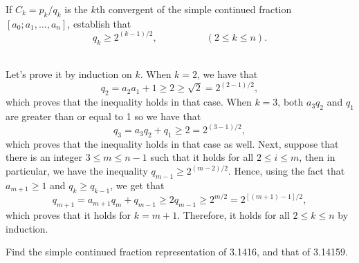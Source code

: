\begin{exercise}
    If $C_k = p_k/q_k$ is the $k$th convergent of the simple continued fraction $[a_0; a_1, ..., a_n]$, establish that
    $$q_k \geq 2^{(k-1)/2}, \qquad \quad \qquad (2\leq k \leq n).$$
     \\
\end{exercise}

\begin{solution}
    Let's prove it by induction on $k$. When $k = 2$, we have that
    $$q_2 = a_2a_1 + 1 \geq 2 \geq \sqrt{2} = 2^{(2-1)/2},$$
    which proves that the inequality holds in that case. When $k = 3$, both $a_3q_2$ and $q_1$ are greater than or equal to 1 so we have that
    $$q_3 = a_3q_2 + q_1 \geq 2 = 2^{(3-1)/2},$$
    which proves that the inequality holds in that case as well. Next, suppose that there is an integer $3 \leq m \leq n-1$ such that it holds for all $2 \leq i \leq m$, then in particular, we have the inequality $q_{m-1} \geq 2^{(m-2)/2}$. Hence, using the fact that $a_{m+1} \geq 1$ and $q_k \geq q_{k-1}$, we get that
    $$q_{m+1} = a_{m+1}q_m + q_{m-1} \geq 2q_{m-1} \geq 2^{m/2} = 2^{[(m+1) - 1]/2},$$ which proves that it holds for $k = m+1$. Therefore, it holds for all $2 \leq k \leq n$ by induction. \\
\end{solution}

\begin{exercise}
    Find the simple continued fraction representation of 3.1416, and that of 3.14159. \\
\end{exercise}

